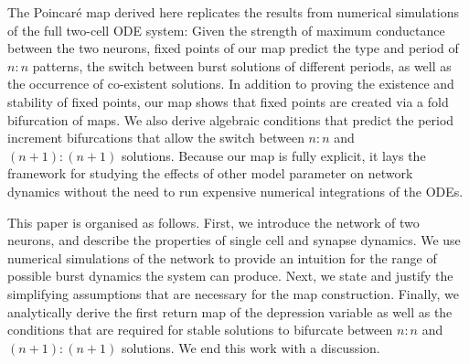 The Poincaré map derived here replicates the results from numerical simulations of the
full two-cell ODE system: Given the strength of maximum conductance between the two
neurons, fixed points of our map predict the type and period of $n:n$ patterns, the switch
between burst solutions of different periods, as well as the occurrence of co-existent
solutions.
In addition to proving the existence and stability of fixed points, our map shows that fixed points are created via a fold bifurcation of maps.
We also derive algebraic conditions that predict the period increment bifurcations that allow the switch between $n:n$ and $(n+1):(n+1)$ solutions.
Because our map is fully explicit, it lays the framework for studying the effects of other model parameter on network dynamics without the need to run expensive numerical integrations of the ODEs.

This paper is organised as follows.
First, we introduce the network of two neurons, and describe the properties of single cell and synapse dynamics.
We use numerical simulations of the network to provide an intuition for the range of possible burst dynamics the system can produce.
Next, we state and justify the simplifying assumptions that are necessary for the map construction.
Finally, we analytically derive the first return map of the depression variable as well as the conditions that are required for stable solutions to bifurcate between $n:n$ and $(n+1):(n+1)$ solutions.
We end this work with a discussion.
